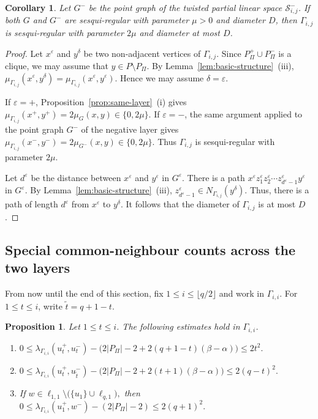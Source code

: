 \documentclass[reqno,a4paper,11pt]{article}
\newtheorem{pro}[thm]{Proposition}
\newtheorem{cor}[thm]{Corollary}
\theoremstyle{definition}
\theoremstyle{remark}
\begin{document}
\begin{cor}\label{cor:sesqui}
Let $G^-$ be the point graph of the twisted partial linear space $\mathcal S^-_{i,j}$.
If both $G$ and $G^-$ are sesqui-regular with parameter $\mu>0$ and diameter $D$, then $\Gamma_{i,j}$ is sesqui-regular with parameter $2\mu$ and diameter at most $D$.
\end{cor}

\begin{proof}
Let $x^\varepsilon$ and $y^\delta$ be two non-adjacent vertices of $\Gamma_{i,j}$.
Since $P_\Pi^+\cup P_\Pi^-$ is a clique, we may assume that $y\in P\setminus P_\Pi$.
By Lemma~\ref{lem:basic-structure}~(iii), 
$\mu_{\Gamma_{i,j}}(x^\varepsilon,y^\delta)=\mu_{\Gamma_{i,j}}(x^\varepsilon,y^\varepsilon)$.
Hence we may assume $\delta=\varepsilon$.

If $\varepsilon=+$, Proposition~\ref{prop:same-layer}~(i) gives
$
\mu_{\Gamma_{i,j}}(x^+,y^+)=2\mu_G(x,y)\in\{0,2\mu\}.$
If $\varepsilon=-$, the same argument applied to the point graph $G^-$ of the negative layer gives
$\mu_{\Gamma_{i,j}}(x^-,y^-)=2\mu_{G^-}(x,y)\in\{0,2\mu\}.$
Thus $\Gamma_{i,j}$ is sesqui-regular with parameter $2\mu$.

Let $d^\varepsilon$ be the distance between $x^\varepsilon$ and $y^\varepsilon$ in $G^\varepsilon$.
There is a path $x^\varepsilon z^\varepsilon_1 z^\varepsilon_{2}\cdots z^\varepsilon_{d^\varepsilon-1}y^\varepsilon$ in $G^\varepsilon$.
By Lemma~\ref{lem:basic-structure}~(iii), $z^\varepsilon_{d^\varepsilon-1}\in N_{\Gamma_{i,j}}(y^\delta)$.
Thus, there is a path of length $d^\varepsilon$ from $x^\varepsilon$ to $y^\delta$.
It follows that the diameter of $\Gamma_{i,j}$ is at most $D$.
\end{proof}

\subsection{Special common-neighbour counts across the two layers}

From now until the end of this section, fix $1\le i\le \lfloor q/2\rfloor$ and work in $\Gamma_{i,i}$.
For $1\le t\le i$, write $\widetilde t=q+1-t$.

\begin{pro}\label{prop:special-values}
Let $1\le t\le i$.
The following estimates hold in $\Gamma_{i,i}$.
\begin{enumerate}[label=\textup{(\roman*)}]
\item
$0\le
\lambda_{\Gamma_{i,i}}(u_t^+,u_t^-)
-
\bigl(2|P_\Pi|-2+2(q+1-t)(\beta-\alpha)\bigr)
\le 2t^2.$
\item
$0\le
\lambda_{\Gamma_{i,i}}(u_t^+,u_{\widetilde t}^-)
-
\bigl(2|P_\Pi|-2+2(t+1)(\beta-\alpha)\bigr)
\le 2(q-t)^2.$
\item If $w\in \ell_{1,1}\setminus\bigl(\{u_1\}\cup \ell_{q,1}\bigr),$
then
$
0\le
\lambda_{\Gamma_{i,i}}(u_1^+,w^-)-(2|P_\Pi|-2)
\le 2(q+1)^2.$
\end{enumerate}
\end{pro}
\end{document}
